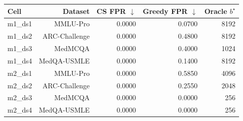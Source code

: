 \begingroup
\centering
\small
\begin{tabular}{lrrrr}
\toprule
Cell & Dataset & CS FPR $\downarrow$ & Greedy FPR $\downarrow$ & Oracle $b^\star$ \\
\midrule
m1\_ds1 & MMLU-Pro & 0.0000 & 0.0700 & 8192 \\
m1\_ds2 & ARC-Challenge & 0.0000 & 0.4800 & 8192 \\
m1\_ds3 & MedMCQA & 0.0000 & 0.4000 & 1024 \\
m1\_ds4 & MedQA-USMLE & 0.0000 & 0.1400 & 8192 \\
m2\_ds1 & MMLU-Pro & 0.0000 & 0.5850 & 4096 \\
m2\_ds2 & ARC-Challenge & 0.0000 & 0.2550 & 2048 \\
m2\_ds3 & MedMCQA & 0.0000 & 0.0000 & 256 \\
m2\_ds4 & MedQA-USMLE & 0.0000 & 0.0000 & 256 \\
\bottomrule
\end{tabular}
\par\medskip
{}
\label{tab:a03_cs_greedy}
\par
\endgroup
\vspace{\baselineskip}
